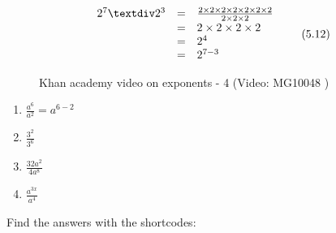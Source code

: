     \begin{equation}
    \begin{array}{ccc}\hfill {2}^{7}÷{2}^{3}& =& \frac{2\ensuremath{\times}2\ensuremath{\times}2\ensuremath{\times}2\ensuremath{\times}2\ensuremath{\times}2\ensuremath{\times}2}{2\ensuremath{\times}2\ensuremath{\times}2}\hfill \\ & =& 2\ensuremath{\times}2\ensuremath{\times}2\ensuremath{\times}2\hfill \\ & =& {2}^{4}\hfill \\ & =& {2}^{7-3}\hfill \end{array}\tag{5.12}
      \end{equation}
\label{m38359*eip-693}
    \setcounter{subfigure}{0}
	\begin{figure}[H] %
    \textnormal{Khan academy video on exponents - 4}\vspace{.1in} \nopagebreak
  \label{m38359*yt-media6}\label{m38359*yt-video6}
             { (Video:  MG10048 )}
      \vspace{2pt}
    \vspace{.1in}
 \end{figure}       \par \label{m38359*secfhsst!!!underscore!!!id1192}
            \nopagebreak
        \label{m38359*id65493}\begin{enumerate}[noitemsep, label=\textbf{\arabic*}. ] 
            \label{m38359*uid25}\item 
            $\frac{{a}^{6}}{{a}^{2}}={a}^{6-2}$
      \label{m38359*uid26}\item 
        $\frac{{3}^{2}}{{3}^{6}}$
      \label{m38359*uid27}\item 
        $\frac{32{a}^{2}}{4{a}^{8}}$
      \label{m38359*uid28}\item 
        $\frac{{a}^{3x}}{{a}^{4}}$
\newline
\newline
          \end{enumerate}
      \label{m38359*uid29}
\par {} Find the answers with the shortcodes:
